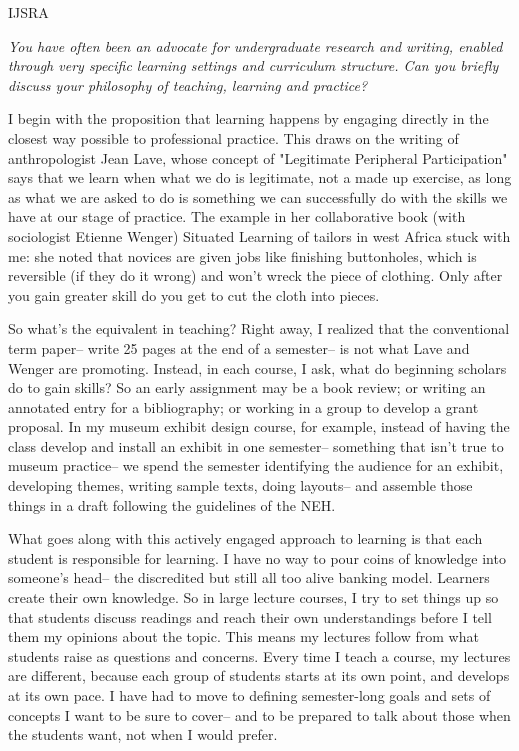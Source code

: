 \begin{labeling}{IJSRA}
	\item[IJSRA (International Journal of Student Research in Archaeology)] \emph{You have often been an advocate for undergraduate research and writing, enabled through very specific learning settings and curriculum structure.  Can you briefly discuss your philosophy of teaching, learning and practice?}
	
	\item[RAJ (Dr. Rosemary A Joyce)] I begin with the proposition that learning happens by engaging directly in the closest way possible to professional practice. This draws on the writing of anthropologist Jean Lave, whose concept of "Legitimate Peripheral Participation" says that we learn when what we do is legitimate, not a made up exercise, as long as what we are asked to do is something we can successfully do with the skills we have at our stage of practice. The example in her collaborative book (with sociologist Etienne Wenger) Situated Learning of tailors in west Africa stuck with me: she noted that novices are given jobs like finishing buttonholes, which is reversible (if they do it wrong) and won't wreck the piece of clothing. Only after you gain greater skill do you get to cut the cloth into pieces. 
	
	So what's the equivalent in teaching? Right away, I realized that the conventional term paper-- write 25 pages at the end of a semester-- is not what Lave and Wenger are promoting. Instead, in each course, I ask, what do beginning scholars do to gain skills? So an early assignment may be a book review; or writing an annotated entry for a bibliography; or working in a group to develop a grant proposal. In my museum exhibit design course, for example, instead of having the class develop and install an exhibit in one semester-- something that isn't true to museum practice-- we spend the semester identifying the audience for an exhibit, developing themes, writing sample texts, doing layouts-- and assemble those things in a draft following the guidelines of the NEH.
	
	What goes along with this actively engaged approach to learning is that each student is responsible for learning. I have no way to pour coins of knowledge into someone's head-- the discredited but still all too alive banking model. Learners create their own knowledge. So in large lecture courses, I try to set things up so that students discuss readings and reach their own understandings before I tell them my opinions about the topic. This means my lectures follow from what students raise as questions and concerns. Every time I teach a course, my lectures are different, because each group of students starts at its own point, and develops at its own pace. I have had to move to defining semester-long goals and sets of concepts I want to be sure to cover-- and to be prepared to talk about those when the students want, not when I would prefer.


\end{labeling}
